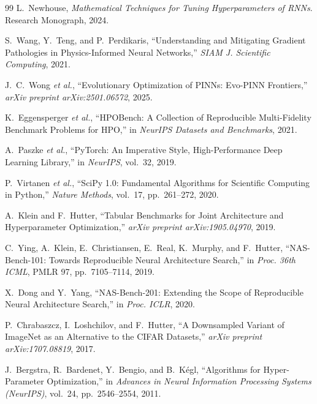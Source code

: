 \documentclass[12pt,a4paper]{article}
\begin{document}
\begin{thebibliography}{99}
L.~Newhouse,
\textit{Mathematical Techniques for Tuning Hyperparameters of RNNs}.
Research Monograph, 2024.

S.~Wang, Y.~Teng, and P.~Perdikaris,
``Understanding and Mitigating Gradient Pathologies in Physics-Informed
Neural Networks,''
\textit{SIAM J. Scientific Computing}, 2021.

J.~C.~Wong \textit{et al.},
``Evolutionary Optimization of PINNs: Evo-PINN Frontiers,''
\textit{arXiv preprint arXiv:2501.06572}, 2025.

K.~Eggensperger \textit{et al.},
``HPOBench: A Collection of Reproducible Multi-Fidelity Benchmark Problems for HPO,''
in \textit{NeurIPS Datasets and Benchmarks}, 2021.

A.~Paszke \textit{et al.},
``PyTorch: An Imperative Style, High-Performance Deep Learning Library,''
in \textit{NeurIPS}, vol.~32, 2019.

P.~Virtanen \textit{et al.},
``SciPy 1.0: Fundamental Algorithms for Scientific Computing in Python,''
\textit{Nature Methods}, vol.~17, pp.~261--272, 2020.


A.~Klein and F.~Hutter,
``Tabular Benchmarks for Joint Architecture and Hyperparameter Optimization,''
\textit{arXiv preprint arXiv:1905.04970}, 2019.

C.~Ying, A.~Klein, E.~Christiansen, E.~Real, K.~Murphy, and F.~Hutter,
``NAS-Bench-101: Towards Reproducible Neural Architecture Search,''
in \textit{Proc. 36th ICML}, PMLR 97, pp.~7105--7114, 2019.

X.~Dong and Y.~Yang,
``NAS-Bench-201: Extending the Scope of Reproducible Neural Architecture
Search,'' in \textit{Proc. ICLR}, 2020.

P.~Chrabaszcz, I.~Loshchilov, and F.~Hutter,
``A Downsampled Variant of ImageNet as an Alternative to the CIFAR Datasets,''
\textit{arXiv preprint arXiv:1707.08819}, 2017.


J.~Bergstra, R.~Bardenet, Y.~Bengio, and B.~K\'{e}gl,
``Algorithms for Hyper-Parameter Optimization,''
in \textit{Advances in Neural Information Processing Systems (NeurIPS)},
vol.~24, pp.~2546--2554, 2011.


\end{thebibliography}
\end{document}
